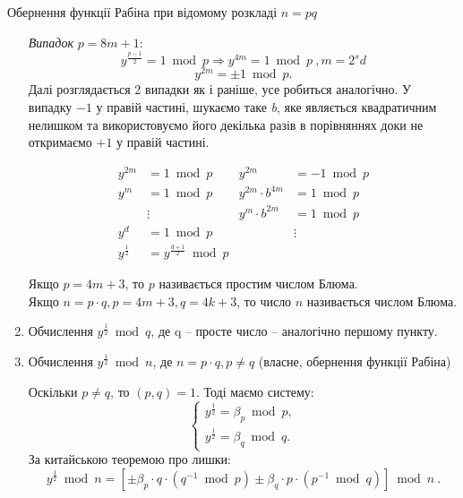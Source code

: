 \begin{algorithm}{Обернення функції Рабіна при відомому розкладі $n = pq$}
\begin{enumerate}
\textit{Випадок} $p=8m+1$: \\
\[
y^{\frac{p-1}{2}}=1 \bmod p \Rightarrow y^{4m}=1 \bmod p \:, m=2^sd
\]
\[
 y^{2m}= \pm 1 \bmod p. 
\]
Далі розглядається 2 випадки як і раніше, усе робиться аналогічно. У випадку $-1$ у правій частині, шукаємо таке \textsl{b}, яке являється квадратичним нелишком та використовуємо його декілька разів в порівняннях доки не откримаємо $+1$ у правій частині. 

\begin{align*}
y^{2m}&=1 \bmod p & y^{2m} &= -1 \bmod p \\
y^{m}&=1 \bmod p   & y^{2m}\cdot b^{4m} &=1 \bmod p \\
&\vdots & y^{m}\cdot b^{2m} &= 1 \bmod p \\
y^d &=1 \bmod p         & &\vdots \\
y^{\frac{1}{2}} &= y^{\frac{d+1}{2}} \bmod p &&
\end{align*}

\begin{remark}
Якщо $p=4m+3$, то $p$ називається простим числом Блюма. \\
Якщо $n = p \cdot q, p=4m+3, q=4k+3$, то число $n$ називається числом Блюма.
\end{remark}

\item Обчислення $y ^{\frac{1}{2}} \bmod q$, де q -- просте число -- аналогічно першому пункту.

\item Обчислення $y ^{\frac{1}{2}} \bmod n$, де $n = p \cdot q, p\neq q$ (власне, обернення функції Рабіна)

Оскільки $p\neq q$, то $(p, q) = 1$. Тоді маємо систему:
\begin{equation*}
\begin{cases}
y^{\frac{1}{2}}=\beta_p \bmod p,\\
y^{\frac{1}{2}}=\beta_q \bmod q.
\end{cases}
\end{equation*}
За китайською теоремою про лишки: 
\[
y^{\frac{1}{2}} \bmod n = [\pm\beta_p \cdot q \cdot (q^{-1}\bmod p) \pm \beta_q \cdot p \cdot(p^{-1} \bmod q)]\bmod n \:.
\]

\end{enumerate}
\end{algorithm}


